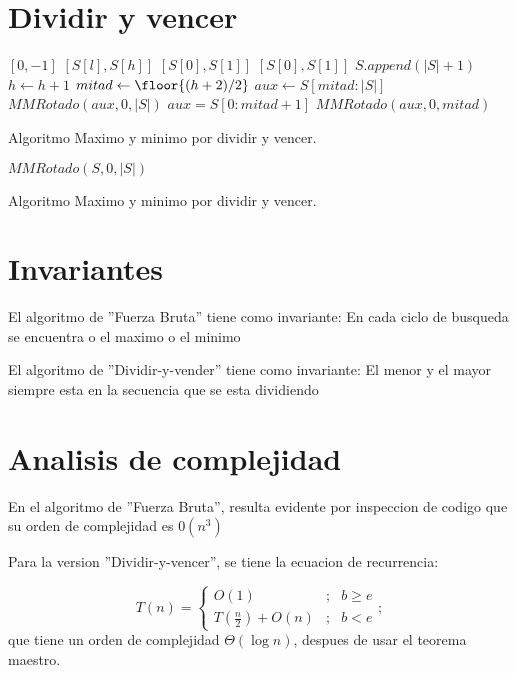 \documentclass[12pt]{report}
\begin{document}
\section{Dividir y vencer}
\begin{algorithm}[H]
  \begin{algorithmic}[2]
            \State\Return $[0,-1]$
            \State\Return $[S[l],S[h]]$
            \State\Return $[S[0],S[1]]$
            \State\Return $[S[0],S[1]]$
        \Else
                \State $S.append(\left |S\right| + 1)$
                \State $h \leftarrow h + 1$
            \EndIf
            \State $mitad \leftarrow\floor{(h+2)/2}$
                \State $aux \leftarrow S[mitad:\left |S\right|]$
                \State\Return $MMRotado(aux,0,\left |S\right|)$
            \EndIf
                \State $aux = S[0:mitad+1]$
                \State\Return $MMRotado(aux,0,mitad)$
            \EndIf
        \EndIf
    \EndProcedure
  \end{algorithmic}
  \caption{Algoritmo Maximo y minimo por dividir y vencer.}
\end{algorithm}

\begin{algorithm}[H]
  \begin{algorithmic}[3]
        \state\Return $MMRotado(S,0,\left|S\right|)$
    \EndProcedure
  \end{algorithmic}
  \caption{Algoritmo Maximo y minimo por dividir y vencer.}
\end{algorithm}

\section{Invariantes}
El algoritmo de ''Fuerza Bruta'' tiene como invariante: En cada ciclo de busqueda se encuentra o el maximo o el minimo

El algoritmo de ''Dividir-y-vender'' tiene como invariante: El menor y el mayor siempre esta en la secuencia que se esta dividiendo

\section{Analisis de complejidad}
En el algoritmo de ''Fuerza Bruta'', resulta evidente por inspeccion de codigo que su orden de complejidad es $0(n^3)$

Para la version ''Dividir-y-vencer'', se tiene la ecuacion de recurrencia:

\begin{equation}
T(n)=
\left\{
    \begin{array}{rcl}
        O(1) &; &b \ge e\\
        T\left(\frac{n}{2}\right)+O(n) & ; & b<e
    \end{array}
\right.;
\end{equation}
que tiene un orden de complejidad $\Theta(\log n)$, despues de usar el teorema maestro.
\end{document}
